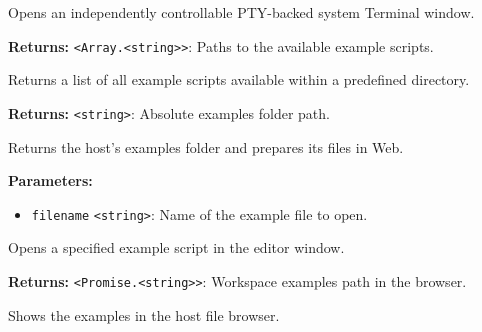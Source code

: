 \documentclass[12pt,a4paper]{article}
\begin{document}
\noindent Opens an independently controllable PTY-backed system Terminal window.

\vspace{5mm}
\noindent {}


\noindent \textbf{Returns:} \texttt{<Array.<string>>}: Paths to the available example scripts.

\noindent Returns a list of all example scripts available within a predefined directory.

\vspace{5mm}
\noindent {}


\noindent \textbf{Returns:} \texttt{<string>}: Absolute examples folder path.

\noindent Returns the host's examples folder and prepares its files in Web.

\vspace{5mm}
\noindent {}


\noindent \textbf{Parameters:}
\begin{itemize}
  \item \texttt{filename} \texttt{<string>}: Name of the example file to open.
\end{itemize}

\noindent Opens a specified example script in the editor window.

\vspace{5mm}
\noindent {}


\noindent \textbf{Returns:} \texttt{<Promise.<string>>}: Workspace examples path in the browser.

\noindent Shows the examples in the host file browser.

\vspace{5mm}
\noindent {}
\end{document}
